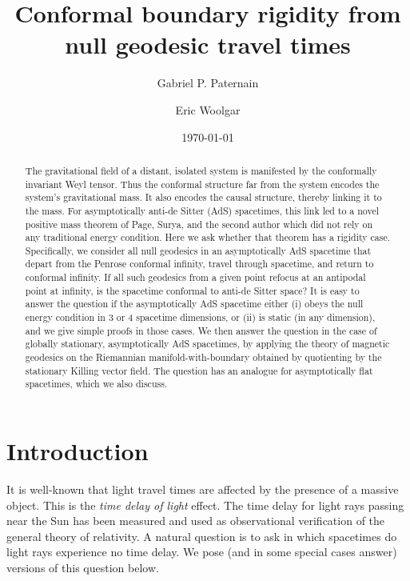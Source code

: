 \documentclass[12pt]{amsart}
\title[Conformal boundary rigidity from null geodesic travel times]{Conformal boundary rigidity from null geodesic travel times}
\author{Gabriel P. Paternain}
\author{Eric Woolgar}
\numberwithin{equation}{section}
\begin{document}
\date{\today}

\begin{abstract}
The gravitational field of a distant, isolated system is manifested by the conformally invariant Weyl tensor. Thus the conformal structure far from the system encodes the system's gravitational mass. It also encodes the causal structure, thereby linking it to the mass. For asymptotically anti-de Sitter (AdS) spacetimes, this link led to a novel positive mass theorem of Page, Surya, and the second author \cite{PSW} which did not rely on any traditional energy condition. Here we ask whether that theorem has a rigidity case. Specifically, we consider all null geodesics in an asymptotically AdS spacetime that depart from the Penrose conformal infinity, travel through spacetime, and return to conformal infinity. If all such geodesics from a given point refocus at an antipodal point at infinity, is the spacetime conformal to anti-de Sitter space? It is easy to answer the question if the asymptotically AdS spacetime either (i) obeys the null energy condition in 3 or 4 spacetime dimensions, or (ii) is static (in any dimension), and we give simple proofs in those cases. We then answer the question in the case of globally stationary, asymptotically AdS spacetimes, by applying the theory of magnetic geodesics on the Riemannian manifold-with-boundary obtained by quotienting by the stationary Killing vector field. The question has an analogue for asymptotically flat spacetimes, which we also discuss.
\end{abstract}

\maketitle

\section{Introduction}\label{section1}
\setcounter{equation}{0}

\noindent It is well-known that light travel times are affected by the presence of a massive object. This is the \emph{time delay of light} effect. The time delay for light rays passing near the Sun has been measured and used as observational verification of the general theory of relativity. A natural question is to ask in which spacetimes do light rays experience no time delay. We pose (and in some special cases answer) versions of this question below.
\end{document}
